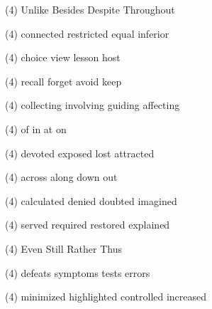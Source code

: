 \item
\begin{tasks}(4)
	\task Unlike
	\task Besides
	\task Despite
	\task Throughout
\end{tasks}
\item
\begin{tasks}(4)
	\task connected
	\task restricted
	\task equal
	\task inferior
\end{tasks}
\item
\begin{tasks}(4)
	\task choice
	\task view
	\task lesson
	\task host
\end{tasks}
\item
\begin{tasks}(4)
	\task recall
	\task forget
	\task avoid
	\task keep
\end{tasks}
\item
\begin{tasks}(4)
	\task collecting
	\task involving
	\task guiding
	\task affecting
\end{tasks}
\item
\begin{tasks}(4)
	\task of
	\task in
	\task at
	\task on
\end{tasks}
\item
\begin{tasks}(4)
	\task devoted
	\task exposed
	\task lost
	\task attracted
\end{tasks}
\item
\begin{tasks}(4)
	\task across
	\task along
	\task down
	\task out
\end{tasks}
\item
\begin{tasks}(4)
	\task calculated
	\task denied
	\task doubted
	\task imagined
\end{tasks}
\item
\begin{tasks}(4)
	\task served
	\task required
	\task restored
	\task explained
\end{tasks}
\item
\begin{tasks}(4)
	\task Even
	\task Still
	\task Rather
	\task Thus
\end{tasks}
\item
\begin{tasks}(4)
	\task defeats
	\task symptoms
	\task tests
	\task errors
\end{tasks}
\item
\begin{tasks}(4)
	\task minimized
	\task highlighted
	\task controlled
	\task increased
\end{tasks}
